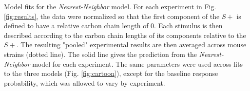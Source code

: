 \label{fig:model_fits}
Model fits for the \textit{Nearest-Neighbor} model.  For each experiment in Fig. \ref{fig:results}, the data were normalized so that the first component of the $S+$ is defined to have a relative carbon chain length of 0.  Each stimulus is then described according to the carbon chain lengths of its components relative to the $S+$.  The resulting "pooled" experimental results are then averaged across mouse strains (dotted line). The solid line gives the prediction from the \textit{Nearest-Neighbor} model for each experiment.  The same parameters were used across fits to the three models (Fig. \ref{fig:cartoon}), except for the baseline response probability, which was allowed to vary by experiment.   
